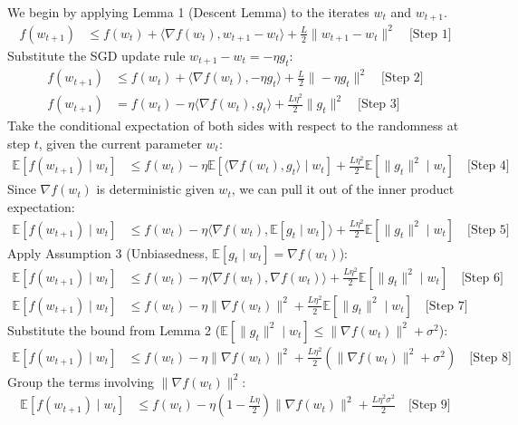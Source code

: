 \documentclass[11pt]{article}
\begin{document}
We begin by applying Lemma 1 (Descent Lemma) to the iterates $w_t$ and $w_{t+1}$.
\begin{align}
    f(w_{t+1}) &\leq f(w_t) + \langle \nabla f(w_t), w_{t+1} - w_t \rangle + \frac{L}{2} \|w_{t+1} - w_t\|^2 \quad \text{[Step 1]}
\end{align}
Substitute the SGD update rule $w_{t+1} - w_t = -\eta g_t$:
\begin{align}
    f(w_{t+1}) &\leq f(w_t) + \langle \nabla f(w_t), -\eta g_t \rangle + \frac{L}{2} \|-\eta g_t\|^2 \quad \text{[Step 2]} \\
    f(w_{t+1}) &= f(w_t) - \eta \langle \nabla f(w_t), g_t \rangle + \frac{L\eta^2}{2} \|g_t\|^2 \quad \text{[Step 3]}
\end{align}
Take the conditional expectation of both sides with respect to the randomness at step $t$, given the current parameter $w_t$:
\begin{align}
    \mathbb{E}[f(w_{t+1}) \mid w_t] &\leq f(w_t) - \eta \mathbb{E}[\langle \nabla f(w_t), g_t \rangle \mid w_t] + \frac{L\eta^2}{2} \mathbb{E}[\|g_t\|^2 \mid w_t] \quad \text{[Step 4]}
\end{align}
Since $\nabla f(w_t)$ is deterministic given $w_t$, we can pull it out of the inner product expectation:
\begin{align}
    \mathbb{E}[f(w_{t+1}) \mid w_t] &\leq f(w_t) - \eta \langle \nabla f(w_t), \mathbb{E}[g_t \mid w_t] \rangle + \frac{L\eta^2}{2} \mathbb{E}[\|g_t\|^2 \mid w_t] \quad \text{[Step 5]}
\end{align}
Apply Assumption 3 (Unbiasedness, $\mathbb{E}[g_t \mid w_t] = \nabla f(w_t)$):
\begin{align}
    \mathbb{E}[f(w_{t+1}) \mid w_t] &\leq f(w_t) - \eta \langle \nabla f(w_t), \nabla f(w_t) \rangle + \frac{L\eta^2}{2} \mathbb{E}[\|g_t\|^2 \mid w_t] \quad \text{[Step 6]} \\
    \mathbb{E}[f(w_{t+1}) \mid w_t] &\leq f(w_t) - \eta \|\nabla f(w_t)\|^2 + \frac{L\eta^2}{2} \mathbb{E}[\|g_t\|^2 \mid w_t] \quad \text{[Step 7]}
\end{align}
Substitute the bound from Lemma 2 ($\mathbb{E}[\|g_t\|^2 \mid w_t] \leq \|\nabla f(w_t)\|^2 + \sigma^2$):
\begin{align}
    \mathbb{E}[f(w_{t+1}) \mid w_t] &\leq f(w_t) - \eta \|\nabla f(w_t)\|^2 + \frac{L\eta^2}{2} \left( \|\nabla f(w_t)\|^2 + \sigma^2 \right) \quad \text{[Step 8]}
\end{align}
Group the terms involving $\|\nabla f(w_t)\|^2$:
\begin{align}
    \mathbb{E}[f(w_{t+1}) \mid w_t] &\leq f(w_t) - \eta \left( 1 - \frac{L\eta}{2} \right) \|\nabla f(w_t)\|^2 + \frac{L\eta^2\sigma^2}{2} \quad \text{[Step 9]}
\end{align}
\end{document}
